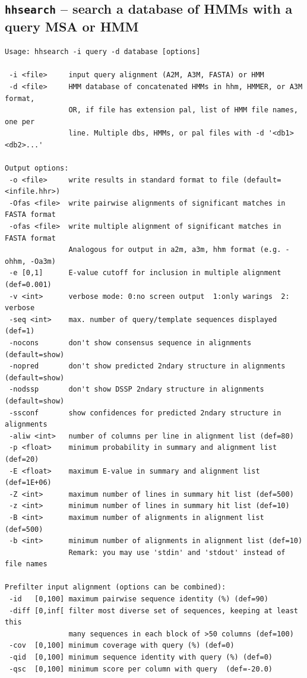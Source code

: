 \documentclass[11pt,a4paper]{article}
\begin{document}
\subsection{{\tt hhsearch} -- search a database of HMMs with a query MSA or HMM}

\small 
\begin{verbatim}
Usage: hhsearch -i query -d database [options]                       

 -i <file>     input query alignment (A2M, A3M, FASTA) or HMM
 -d <file>     HMM database of concatenated HMMs in hhm, HMMER, or A3M format,
               OR, if file has extension pal, list of HMM file names, one per
               line. Multiple dbs, HMMs, or pal files with -d '<db1> <db2>...'

Output options:                                                              
 -o <file>     write results in standard format to file (default=<infile.hhr>)
 -Ofas <file>  write pairwise alignments of significant matches in FASTA format
 -ofas <file>  write multiple alignment of significant matches in FASTA format
               Analogous for output in a2m, a3m, hhm format (e.g. -ohhm, -Oa3m)
 -e [0,1]      E-value cutoff for inclusion in multiple alignment (def=0.001)    
 -v <int>      verbose mode: 0:no screen output  1:only warings  2: verbose   
 -seq <int>    max. number of query/template sequences displayed (def=1) 
 -nocons       don't show consensus sequence in alignments (default=show)     
 -nopred       don't show predicted 2ndary structure in alignments (default=show)
 -nodssp       don't show DSSP 2ndary structure in alignments (default=show)  
 -ssconf       show confidences for predicted 2ndary structure in alignments
 -aliw <int>   number of columns per line in alignment list (def=80)
 -p <float>    minimum probability in summary and alignment list (def=20)   
 -E <float>    maximum E-value in summary and alignment list (def=1E+06)       
 -Z <int>      maximum number of lines in summary hit list (def=500)         
 -z <int>      minimum number of lines in summary hit list (def=10)         
 -B <int>      maximum number of alignments in alignment list (def=500)      
 -b <int>      minimum number of alignments in alignment list (def=10)      
               Remark: you may use 'stdin' and 'stdout' instead of file names

Prefilter input alignment (options can be combined):                             
 -id   [0,100] maximum pairwise sequence identity (%) (def=90)   
 -diff [0,inf[ filter most diverse set of sequences, keeping at least this    
               many sequences in each block of >50 columns (def=100)
 -cov  [0,100] minimum coverage with query (%) (def=0) 
 -qid  [0,100] minimum sequence identity with query (%) (def=0) 
 -qsc  [0,100] minimum score per column with query  (def=-20.0)


\end{verbatim}
\end{document}
